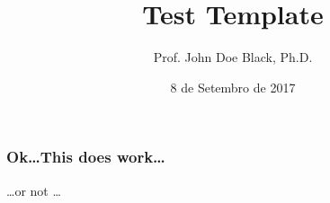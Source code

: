 \documentclass[aspectratio=169,14pt]{beamer}
\title{Test Template}
\author{Prof. John Doe Black, Ph.D.}
\institute{The Greatest Institute Ever Made}
\date{8 de Setembro de 2017}
\begin{document}
\titleframe

\begin{frame}
    \frametitle{Ok\ldots This does work\ldots}

    \Huge \ldots or not \ldots
\end{frame}

\end{document}
